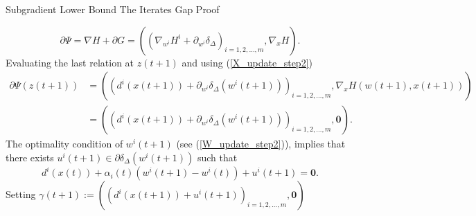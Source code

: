 \documentclass[9pt,handout]{beamer} %
\begin{document}
	\begin{frame}{Subgradient Lower Bound The Iterates Gap Proof}
		\begin{center}
		\end{center}
		\begin{equation*}
			\partial \Psi = \nabla H + \partial G  
			= \left( \left( \nabla_{w^i} H^i + \partial_{w^i} \delta_{\Delta} \right)_{i=1,2, \ldots ,m} , \nabla_x H \right).
		\end{equation*}
		Evaluating the last relation at $z(t+1)$ and using (\ref{X_update_step2})
		\begin{align*}
			\partial \Psi(z(t + 1)) &= \left( \left( d^i(x(t+1)) + \partial_{w^i} \delta_{\Delta}(w^i(t+1)) \right)_{i=1,2, \ldots ,m} , \nabla_x H(w(t+1),x(t+1)) \right) \\
			& = \left( \left( d^i(x(t+1)) + \partial_{w^i} \delta_{\Delta}(w^i(t+1)) \right)_{i=1,2, \ldots ,m} , \mathbf{0} \right).
		\end{align*}
		The optimality condition of $w^i(t+1)$ (see (\ref{W_update_step2})), implies that there exists $u^i(t+1) \in \partial \delta_{\Delta}(w^i(t+1))$ such that
		\begin{equation*}
	d^i(x(t)) + \alpha_i(t) \left( w^i(t+1) - w^i(t) \right) + u^i(t+1) = \mathbf{0}.
		\end{equation*}
		Setting $\gamma(t+1) := \left( \left( d^i(x(t+1)) + u^i(t+1) \right)_{i=1,2, \ldots ,m}, \mathbf{0} \right)$
	\end{frame}
	
\end{document}
